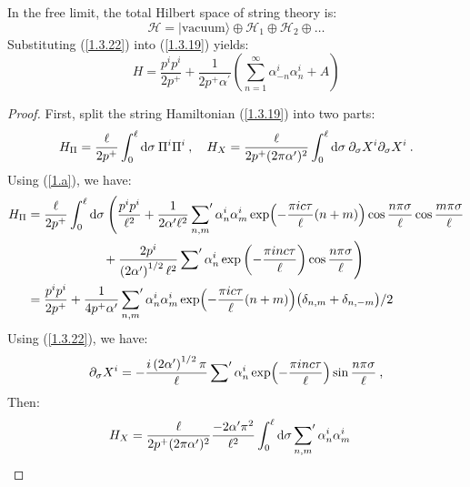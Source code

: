 In the free limit, the total Hilbert space of string theory is: 
\begin{equation}
	\mathscr{H}=\lvert \text{vacuum}\rangle \oplus \mathscr{H}_{1} \oplus \mathscr{H}_{2} \oplus \ldots
\end{equation}
Substituting (\ref{1.3.22}) into (\ref{1.3.19}) yields: 
\begin{equation}
	H=\frac{p^{i} p^{i}}{2 p^{+}}+\frac{1}{2 p^{+} \alpha^{\prime}}\left(\sum_{n=1}^{\infty} \alpha_{-n}^{i} \alpha_{n}^{i}+A\right)
\end{equation}
\begin{tcolorbox}[breakable]
	\begin{proof}
		First, split the string Hamiltonian (\ref{1.3.19}) into two parts:
		\begin{align*}
			H_{\Pi}=\frac{\ell}{2 p^+} \int_{0}^{\ell} \mathrm{d} \sigma \: \Pi^{i} \Pi^{i}\:, \quad 
			H_{X}=\frac{\ell}{2p^{+}(2 \pi \alpha^\prime)^{2} } \int_{0}^{\ell} \mathrm{d} \sigma \:\partial_{\sigma} X^{i} \partial_{\sigma} X^{i} \:. 
		\end{align*}  
		Using (\ref{1.a}), we have:
		\begin{align*}
			H_\Pi&=\frac{\ell}{2 p^+} \int_{0}^{\ell} \mathrm{d} \sigma \:
			\Biggl( \frac{p^{i} p^{i}}{\ell^{2}}
			+\frac{1}{2 \alpha^\prime \ell^2} \sideset{}{'}\sum_{n,m} \alpha_{n}^{i} \alpha_{m}^{i}\exp\Bigl(-\frac{\pi i c \tau}{\ell}(n+m)\Bigr)  \cos \frac{n \pi \sigma}{\ell} \cos \frac{m\pi \sigma}{\ell}  \\
			&\qquad \qquad\qquad  +\frac{2p^{i}}{\left(2 \alpha^{\prime}\right)^{1 / 2 } \ell^{2}} \sideset{}{'}\sum \alpha_{n}^{i} \exp \left(-\frac{\pi i n c \tau}{\ell}\right) \cos \frac{n \pi \sigma}{\ell} \Biggr) \\
			&=\frac{p^{i}p^{i}}{2p^{+}}+\frac{1}{4p^{+}\alpha'}\sideset{}{'}\sum_{n,m} \alpha_{n}^{i} \alpha_{m}^{i}\exp\Bigl(-\frac{\pi i c \tau}{\ell}(n+m)\Bigr)\bigl(\delta_{n,m}+\delta_{n,-m}\bigr)/2
		\end{align*}
		Using (\ref{1.3.22}), we have:
		\begin{align*}
			\partial_\sigma X^{i} =-\frac{i\left(2 \alpha^{\prime}\right)^{1 / 2} \pi}{\ell} \sideset{}{'}\sum \alpha_{n}^{i} \exp \Bigl(-\frac{\pi i n c \tau}{\ell}\Bigr) \sin \frac{n \pi \sigma}{\ell} \:,
		\end{align*}
		Then:
		\begin{align*}
			H_X &=\frac{\ell}{2p^{+}(2 \pi \alpha^\prime)^{2} } \frac{-2 \alpha^\prime \pi^2}{\ell^2} \int_{0}^{\ell} \dif \sigma \sideset{}{'}\sum _{n,m} \alpha_{n}^{i}\alpha_{m}^{i} 

\end{align*}
\end{proof}
\end{tcolorbox}
